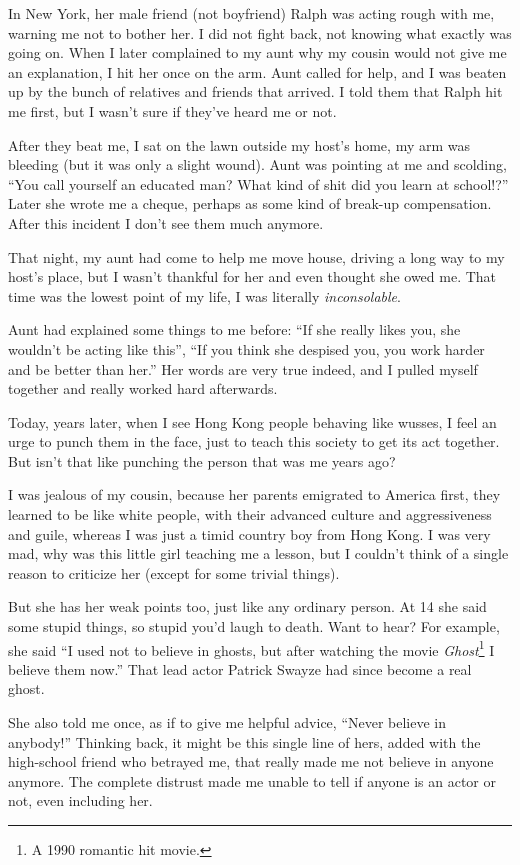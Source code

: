 \documentclass[12pt]{report}
\begin{document}
{
In New York, her male friend (not boyfriend) Ralph was acting rough with me, warning me not to bother her.  I did not fight back, not knowing what exactly was going on.  When I later complained to my aunt why my cousin would not give me an explanation, I hit her once on the arm.  Aunt called for help, and I was beaten up by the bunch of relatives and friends that arrived.  I told them that Ralph hit me first, but I wasn't sure if they've heard me or not.

After they beat me, I sat on the lawn outside my host's home, my arm was bleeding (but it was only a slight wound).  Aunt was pointing at me and scolding, ``You call yourself an educated man?  What kind of shit did you learn at school!?''  Later she wrote me a cheque, perhaps as some kind of break-up compensation.  After this incident I don't see them much anymore.

That night, my aunt had come to help me move house, driving a long way to my host's place, but I wasn't thankful for her and even thought she owed me.  That time was the lowest point of my life, I was literally \textit{inconsolable}.

Aunt had explained some things to me before: ``If she really likes you, she wouldn't be acting like this'', ``If you think she despised you, you work harder and be better than her.''  Her words are very true indeed, and I pulled myself together and really worked hard afterwards.

Today, \resultb years later, when I see Hong Kong people behaving like wusses, I feel an urge to punch them in the face, just to teach this society to get its act together.  But isn't that like punching the person that was me \resultb years ago?

I was jealous of my cousin, because her parents emigrated to America first, they learned to be like white people, with their advanced culture and aggressiveness and guile, whereas I was just a timid country boy from Hong Kong.  I was very mad, why was this little girl teaching me a lesson, but I couldn't think of a single reason to criticize her (except for some trivial things).

But she has her weak points too, just like any ordinary person.  At 14 she said some stupid things, so stupid you'd laugh to death.  Want to hear?  For example, she said ``I used not to believe in ghosts, but after watching the movie \textit{Ghost}\footnote{A 1990 romantic hit movie.} I believe them now.''  That lead actor Patrick Swayze had since become a real ghost.

She also told me once, as if to give me helpful advice, ``Never believe in anybody!''  Thinking back, it might be this single line of hers, added with the high-school friend who betrayed me, that really made me not believe in anyone anymore.  The complete distrust made me unable to tell if anyone is an actor or not, even including her.
}
\end{document}

